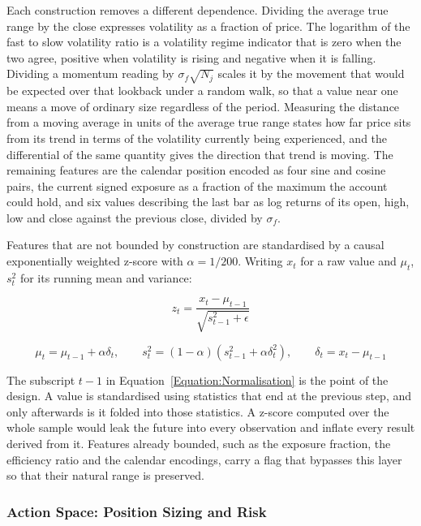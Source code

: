 Each construction removes a different dependence. Dividing the average true range by the close expresses volatility as a fraction of price. The logarithm of the fast to slow volatility ratio is a volatility regime indicator that is zero when the two agree, positive when volatility is rising and negative when it is falling. Dividing a momentum reading by $\sigma_f \sqrt{N_j}$ scales it by the movement that would be expected over that lookback under a random walk, so that a value near one means a move of ordinary size regardless of the period. Measuring the distance from a moving average in units of the average true range states how far price sits from its trend in terms of the volatility currently being experienced, and the differential of the same quantity gives the direction that trend is moving. The remaining features are the calendar position encoded as four sine and cosine pairs, the current signed exposure as a fraction of the maximum the account could hold, and six values describing the last bar as log returns of its open, high, low and close against the previous close, divided by $\sigma_f$.

Features that are not bounded by construction are standardised by a causal exponentially weighted z-score with $\alpha = 1/200$. Writing $x_t$ for a raw value and $\mu_t$, $s^2_t$ for its running mean and variance:

\begin{equation}
z_t = \frac{x_t - \mu_{t-1}}{\sqrt{s^2_{t-1} + \epsilon}}
\label{Equation:Normalisation}
\end{equation}

\begin{equation}
\mu_t = \mu_{t-1} + \alpha \delta_t, \qquad s^2_t = (1 - \alpha)\left(s^2_{t-1} + \alpha \delta_t^2\right), \qquad \delta_t = x_t - \mu_{t-1}
\label{Equation:NormalisationUpdate}
\end{equation}

The subscript $t-1$ in Equation~\ref{Equation:Normalisation} is the point of the design. A value is standardised using statistics that end at the previous step, and only afterwards is it folded into those statistics. A z-score computed over the whole sample would leak the future into every observation and inflate every result derived from it. Features already bounded, such as the exposure fraction, the efficiency ratio and the calendar encodings, carry a flag that bypasses this layer so that their natural range is preserved.

\subsubsection{Action Space: Position Sizing and Risk}

